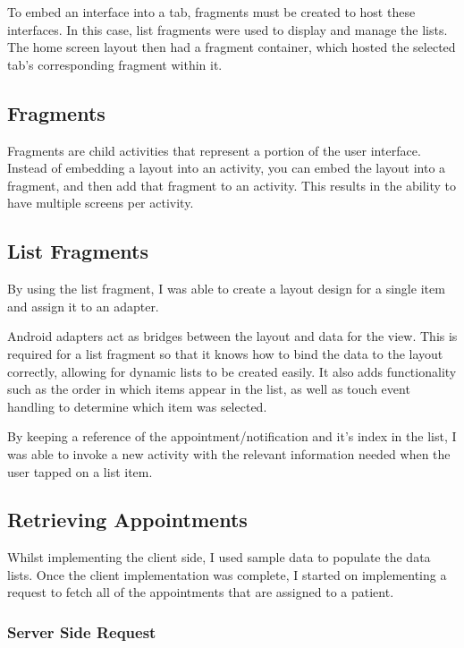 To embed an interface into a tab, fragments must be created to host these interfaces. In this case, list fragments were used to display and manage the lists. The home screen layout then had a fragment container, which hosted the selected tab's corresponding fragment within it.

\subsection{Fragments}

Fragments are child activities that represent a portion of the user interface. Instead of embedding a layout into an activity, you can embed the layout into a fragment, and then add that fragment to an activity. This results in the ability to have multiple screens per activity.

\subsection{List Fragments}

By using the list fragment, I was able to create a layout design for a single item and assign it to an adapter.

Android adapters act as bridges between the layout and data for the view. This is required for a list fragment so that it knows how to bind the data to the layout correctly, allowing for dynamic lists to be created easily. It also adds functionality such as the order in which items appear in the list, as well as touch event handling to determine which item was selected.

By keeping a reference of the appointment/notification and it's index in the list, I was able to invoke a new activity with the relevant information needed when the user tapped on a list item.

\subsection{Retrieving Appointments}

Whilst implementing the client side, I used sample data to populate the data lists. Once the client implementation was complete, I started on implementing a request to fetch all of the appointments that are assigned to a patient.

\subsubsection{Server Side Request}

